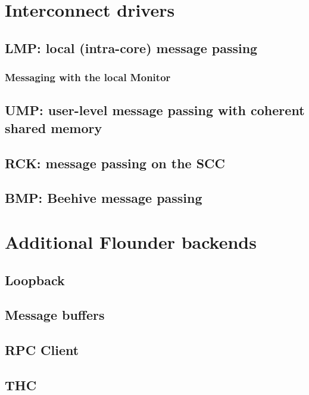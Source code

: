 \documentclass[a4paper,twoside]{report} %
\begin{document}
\chapter{Interconnect drivers}\label{cha:icds}

\section{LMP: local (intra-core) message passing}
\label{sec:lmp_icd}

\subsection{Messaging with the local Monitor}
\label{sec:monitor}


\section{UMP: user-level message passing with coherent shared memory}
\label{sec:ump_icd}

\section{RCK: message passing on the SCC}
\label{sec:rck_icd}

\section{BMP: Beehive message passing}
\label{sec:bmp_icd}

\chapter{Additional Flounder backends}

\section{Loopback}

\section{Message buffers}

\section{RPC Client}
\label{sec:rpcclient}

\section{THC}
\label{sec:thc}
\end{document}
